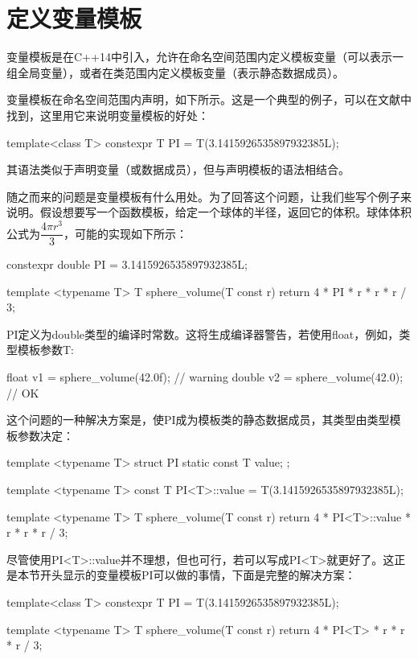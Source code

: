 \section{定义变量模板}
变量模板是在C++14中引入，允许在命名空间范围内定义模板变量（可以表示一组全局变量），或者在类范围内定义模板变量（表示静态数据成员）。

变量模板在命名空间范围内声明，如下所示。这是一个典型的例子，可以在文献中找到，这里用它来说明变量模板的好处：

\begin{cppcode}
template<class T>
constexpr T PI = T(3.1415926535897932385L);
\end{cppcode}

其语法类似于声明变量（或数据成员），但与声明模板的语法相结合。

随之而来的问题是变量模板有什么用处。为了回答这个问题，让我们些写个例子来说明。假设想要写一个函数模板，给定一个球体的半径，返回它的体积。球体体积公式为$\dfrac{4\pi r^{3}}{3}$，可能的实现如下所示：

\begin{cppcode}
constexpr double PI = 3.1415926535897932385L;

template <typename T>
T sphere_volume(T const r)
{
	return 4 * PI * r * r * r / 3;
}
\end{cppcode}

PI定义为double类型的编译时常数。这将生成编译器警告，若使用float，例如，类型模板参数T:

\begin{cppcode}
float v1 = sphere_volume(42.0f); // warning
double v2 = sphere_volume(42.0); // OK
\end{cppcode}

这个问题的一种解决方案是，使PI成为模板类的静态数据成员，其类型由类型模板参数决定：

\begin{cppcode}
template <typename T>
struct PI
{
	static const T value;
};

template <typename T>
const T PI<T>::value = T(3.1415926535897932385L);

template <typename T>
T sphere_volume(T const r)
{
	return 4 * PI<T>::value * r * r * r / 3;
}
\end{cppcode}

尽管使用PI<T>::value并不理想，但也可行，若可以写成PI<T>就更好了。这正是本节开头显示的变量模板PI可以做的事情，下面是完整的解决方案：

\begin{cppcode}
template<class T>
constexpr T PI = T(3.1415926535897932385L);

template <typename T>
T sphere_volume(T const r)
{
	return 4 * PI<T> * r * r * r / 3;
}
\end{cppcode}

